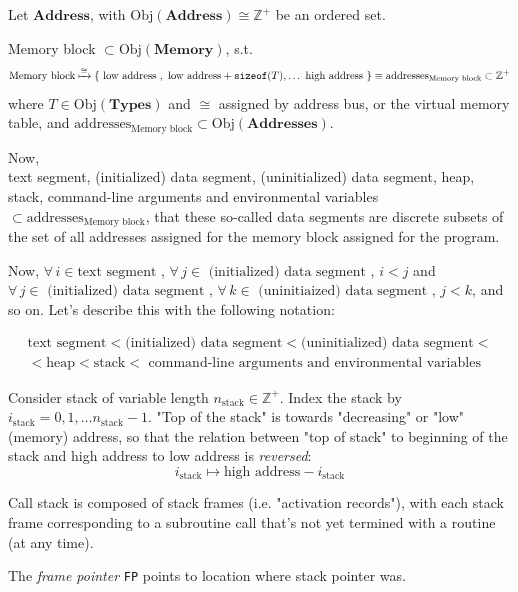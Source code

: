 \documentclass[10pt]{amsart}
\begin{document}
\begin{multicols*}{2}
Let $\textbf{Address}$, with $\text{Obj}{(\textbf{Address})} \cong \mathbb{Z}^+$ be an ordered set.  

Memory block $\subset \text{Obj}{(\textbf{Memory})}$, s.t. 
\[
\text{Memory block} \xmapsto{ \cong } \lbrace \text{ low address }, \text{ low address} + \texttt{sizeof}(T) , \dots \text{ high address } \rbrace  \equiv \text{addresses}_{\text{Memory block} } \subset \mathbb{Z}^+
\]
where $T \in \text{Obj}{(\textbf{Types})}$ and $\cong$ assigned by address bus, or the virtual memory table, and $\text{addresses}_{\text{Memory block}} \subset \text{Obj}{(\textbf{Addresses})}$.  

Now, \\
text segment, (initialized) data segment, (uninitialized) data segment, heap, stack, command-line arguments and environmental variables $\subset \text{addresses}_{\text{Memory block}}$, that these so-called data segments are discrete subsets of the set of all addresses assigned for the memory block assigned for the program.  

Now, $\forall \, i \in \text{text segment }, \, \forall \, j \in \text{ (initialized) data segment }$, $i<j$ and $\forall \, j \in \text{ (initialized) data segment }, \, \forall \, k \in \text{ (uninitiaized) data segment }$, $j<k$, and so on.  Let's describe this with the following notation:  

\begin{equation}
\begin{gathered}
\text{text segment} < \text{(initialized) data segment} < \text{(uninitialized) data segment} < \\ 
< \text{heap} < \text{stack} < \text{ command-line arguments and environmental variables}  
\end{gathered}
\end{equation}


Consider stack of variable length $n_{\text{stack}} \in \mathbb{Z}^+$.  Index the stack by $i_{\text{stack}} = 0,1,\dots n_{\text{stack}} - 1$.  "Top of the stack" is towards "decreasing" or "low" (memory) address, so that the relation between "top of stack" to beginning of the stack and high address to low address is \emph{reversed}: 
\[
i_{\text{stack}} \mapsto \text{high address} - i_{\text{stack}}
\]

Call stack is composed of stack frames (i.e. "activation records"), with each stack frame corresponding to a subroutine call that's not yet termined with a routine (at any time).  

The \emph{frame pointer} \verb|FP| points to location where stack pointer was.  


\end{multicols*}
\end{document}
